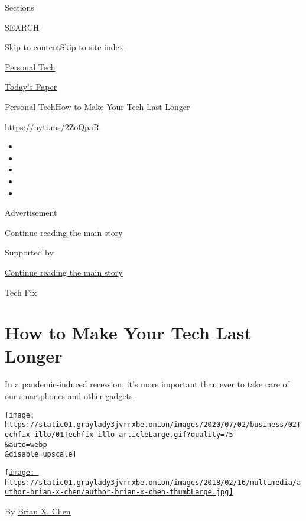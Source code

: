Sections

SEARCH

\protect\hyperlink{site-content}{Skip to
content}\protect\hyperlink{site-index}{Skip to site index}

\href{https://www.nytimes3xbfgragh.onion/section/technology/personaltech}{Personal
Tech}

\href{https://myaccount.nytimes3xbfgragh.onion/auth/login?response_type=cookie\&client_id=vi}{}

\href{https://www.nytimes3xbfgragh.onion/section/todayspaper}{Today's
Paper}

\href{/section/technology/personaltech}{Personal Tech}\textbar{}How to
Make Your Tech Last Longer

\href{https://nyti.ms/2ZoQpaR}{https://nyti.ms/2ZoQpaR}

\begin{itemize}
\item
\item
\item
\item
\item
\end{itemize}

Advertisement

\protect\hyperlink{after-top}{Continue reading the main story}

Supported by

\protect\hyperlink{after-sponsor}{Continue reading the main story}

Tech Fix

\hypertarget{how-to-make-your-tech-last-longer}{%
\section{How to Make Your Tech Last
Longer}\label{how-to-make-your-tech-last-longer}}

In a pandemic-induced recession, it's more important than ever to take
care of our smartphones and other gadgets.

\texttt{[image: https://static01.graylady3jvrrxbe.onion/images/2020/07/02/business/02Techfix-illo/01Techfix-illo-articleLarge.gif?quality=75\\\&auto=webp\\\&disable=upscale]}

\href{https://www.nytimes3xbfgragh.onion/by/brian-x-chen}{\texttt{[image: https://static01.graylady3jvrrxbe.onion/images/2018/02/16/multimedia/author-brian-x-chen/author-brian-x-chen-thumbLarge.jpg]}}

By \href{https://www.nytimes3xbfgragh.onion/by/brian-x-chen}{Brian X.
Chen}

